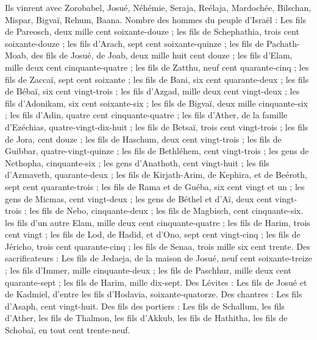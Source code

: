 \begin{multicols}{2}
Ils vinrent avec Zorobabel, Josué, Néhémie, Seraja, Reélaja, Mardochée, Bilschan, Mispar, Bigvaï, Rehum, Baana. Nombre des hommes du peuple d'Israël :
Les fils de Pareosch, deux mille cent soixante-douze ;
les fils de Schephathia, trois cent soixante-douze ;
les fils d'Arach, sept cent soixante-quinze ;
les fils de Pachath-Moab, des fils de Josué, de Joab, deux mille huit cent douze ;
les fils d'Elam, mille deux cent cinquante-quatre ;
les fils de Zatthu, neuf cent quarante-cinq ;
les fils de Zaccaï, sept cent soixante ;
les fils de Bani, six cent quarante-deux ;
les fils de Bébaï, six cent vingt-trois ;
les fils d'Azgad, mille deux cent vingt-deux ;
les fils d'Adonikam, six cent soixante-six ;
les fils de Bigvaï, deux mille cinquante-six ;
les fils d'Adin, quatre cent cinquante-quatre ;
les fils d'Ather, de la famille d'Ezéchias, quatre-vingt-dix-huit ;
les fils de Betsaï, trois cent vingt-trois ;
les fils de Jora, cent douze ;
les fils de Haschum, deux cent vingt-trois ;
les fils de Guibbar, quatre-vingt-quinze ;
les fils de Bethléhem, cent vingt-trois ;
les gens de Nethopha, cinquante-six ;
les gens d'Anathoth, cent vingt-huit ;
les fils d'Azmaveth, quarante-deux ;
les fils de Kirjath-Arim, de Kephira, et de Beéroth, sept cent quarante-trois ;
les fils de Rama et de Guéba, six cent vingt et un ;
les gens de Micmas, cent vingt-deux ;
les gens de Béthel et d'Aï, deux cent vingt-trois ;
les fils de Nebo, cinquante-deux ;
les fils de Magbisch, cent cinquante-six.
les fils d'un autre Elam, mille deux cent cinquante-quatre ;
les fils de Harim, trois cent vingt ;
les fils de Lod, de Hadid, et d'Ono, sept cent vingt-cinq ;
les fils de Jéricho, trois cent quarante-cinq ;
les fils de Senaa, trois mille six cent trente.
Des sacrificateurs : Les fils de Jedaeja, de la maison de Josué, neuf cent soixante-treize ;
les fils d'Immer, mille cinquante-deux ;
les fils de Paschhur, mille deux cent quarante-sept ;
les fils de Harim, mille dix-sept.
Des Lévites : Les fils de Josué et de Kadmiel, d'entre les fils d'Hodavia, soixante-quatorze.
Des chantres : Les fils d'Asaph, cent vingt-huit.
Des fils des portiers : Les fils de Schallum, les fils d'Ather, les fils de Thalmon, les fils d'Akkub, les fils de Hathitha, les fils de Schobaï, en tout cent trente-neuf.

\end{multicols}

